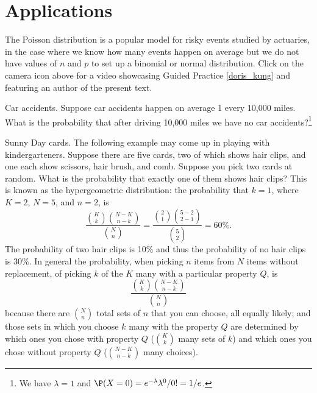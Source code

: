 
\section[Applications]{Applications }
The Poisson distribution is a popular model for risky events studied by actuaries, in the case where we know how many events happen on average but we do not have values of $n$ and $p$ to set up a binomial or normal distribution. Click on the camera icon above for a video showcasing Guided Practice \ref{doris_kung} and featuring an author of the present text.
\begin{exercise}{Car accidents.}\label{doris_kung}
Suppose car accidents happen on average 1 every 10,000 miles.
What is the probability that after driving 10,000 miles we have no car accidents?\footnote{We have $\lambda=1$ and $\P(X=0)=e^{-\lambda}\lambda^0/0! = 1/e$.}
\end{exercise}

\begin{example}{Sunny Day cards.}
The following example may come up in playing with kindergarteners. Suppose there are five cards, two of which shows hair clips, and one each show scissors, hair brush, and comb.
Suppose you pick two cards at random. What is the probability that exactly one of them shows hair clips?
This is known as the hypergeometric distribution: the probability that $k= 1$, where $K=2$, $N=5$, and $n=2$, is
\[
	\frac{
		\binom{K}{k}
		\binom{N-K}{n-k}
	}{
		\binom{N}{n}
	}
	= 
	\frac{
		\binom{2}{1}
		\binom{5-2}{2-1}
	}{
		\binom{5}{2}
	}
	= 60\%.
\]
The probability of two hair clips is 10\% and thus the probability of no hair clips is 30\%.
In general the probability, when picking $n$ items from $N$ items without replacement, of picking $k$ of the $K$ many with a particular property $Q$, is
\[
	\frac{
		\binom{K}{k}
		\binom{N-K}{n-k}
	}{
		\binom{N}{n}
	}
\]
because there are $\binom{N}{n}$ total sets of $n$ that you can choose, all equally likely; and those sets in which you choose $k$ many with the property $Q$ are determined by which ones you chose with
property $Q$ ($\binom{K}{k}$ many sets of $k$) and which ones you chose without property $Q$ ($\binom{N-K}{n-k}$ many choices).
\end{example}

